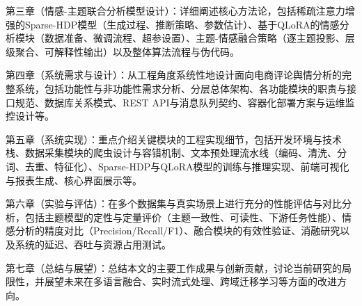 第三章（情感-主题联合分析模型设计）：详细阐述核心方法论，包括稀疏注意力增强的Sparse-HDP模型（生成过程、推断策略、参数估计）、基于QLoRA的情感分析模块（数据准备、微调流程、超参设置）、主题-情感融合策略（逐主题投影、层级聚合、可解释性输出）以及整体算法流程与伪代码。

第四章（系统需求与设计）：从工程角度系统性地设计面向电商评论舆情分析的完整系统，包括功能性与非功能性需求分析、分层总体架构、各功能模块的职责与接口规范、数据库关系模式、REST API与消息队列契约、容器化部署方案与运维监控设计等。

第五章（系统实现）：重点介绍关键模块的工程实现细节，包括开发环境与技术栈、数据采集模块的爬虫设计与容错机制、文本预处理流水线（编码、清洗、分词、去重、特征化）、Sparse-HDP与QLoRA模型的训练与推理实现、前端可视化与报表生成、核心界面展示等。

第六章（实验与评估）：在多个数据集与真实场景上进行充分的性能评估与对比分析，包括主题模型的定性与定量评价（主题一致性、可读性、下游任务性能）、情感分析的精度对比（Precision/Recall/F1）、融合模块的有效性验证、消融研究以及系统的延迟、吞吐与资源占用测试。

第七章（总结与展望）：总结本文的主要工作成果与创新贡献，讨论当前研究的局限性，并展望未来在多语言融合、实时流式处理、跨域迁移学习等方面的改进方向。
